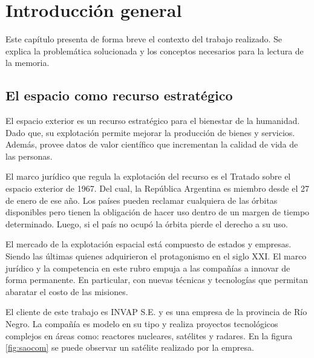 \chapter{Introducción general}
\label{ch:introduccion}

Este capítulo presenta de forma breve el contexto del trabajo realizado.
Se explica la problemática solucionada y los conceptos necesarios para la lectura de la memoria.

\newcommand{\keyword}[1]{\textbf{#1}}
\newcommand{\tabhead}[1]{\textbf{#1}}
\newcommand{\code}[1]{\texttt{#1}}
\newcommand{\file}[1]{\texttt{\bfseries#1}}
\newcommand{\option}[1]{\texttt{\itshape#1}}
\newcommand{\grados}{$^{\circ}$}

\section{El espacio como recurso estratégico}
\label{sec:1space}

El espacio exterior es un recurso estratégico para el bienestar de la humanidad.
Dado que, su explotación permite mejorar la producción de bienes y servicios.
Además, provee datos de valor científico que incrementan la calidad de vida de las personas.

El marco jurídico que regula la explotación del recurso es el Tratado sobre el espacio exterior de 1967.
Del cual, la República Argentina es miembro desde el 27 de enero de ese año.
Los países pueden reclamar cualquiera de las órbitas disponibles pero tienen la obligación de hacer uso dentro de un margen de tiempo determinado.
Luego, si el país no ocupó la órbita pierde el derecho a su uso.

El mercado de la explotación espacial está compuesto de estados y empresas.
Siendo las últimas quienes adquirieron el protagonismo en el siglo XXI.
El marco jurídico y la competencia en este rubro empuja a las compañías a innovar de forma permanente.
En particular, con nuevas técnicas y tecnologías que permitan abaratar el costo de las misiones.

El cliente de este trabajo es INVAP S.E. y es una empresa de la provincia de Río Negro.
La compañía es modelo en su tipo y realiza proyectos tecnológicos complejos en áreas como: reactores nucleares, satélites y radares.
En la figura \ref{fig:saocom} se puede observar un satélite realizado por la empresa.

\newpage

